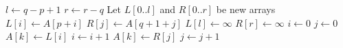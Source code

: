 \begin{algorithmic}[1]
\State $l \gets q - p + 1$
\State $r \gets r - q$
\State Let $L[0..l]$ and $R[0..r]$ be new arrays
    \State $L[i] \gets A[p + i]$
\EndFor
{}
    \State $R[j] \gets A[q + 1 + j]$
\EndFor
\State $L[l] \gets \infty$
\State $R[r] \gets \infty$
\State $i \gets 0$
\State $j \gets 0$
        \State $A[k] \gets L[i]$
        \State $i \gets i + 1$
    \Else
        \State $A[k] \gets R[j]$
        \State $j \gets j + 1$
    \EndIf
\EndFor
\end{algorithmic}
